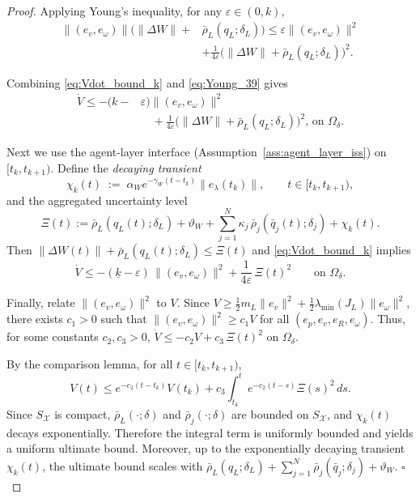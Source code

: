 \documentclass[10pt,a4paper]{amsart}
\begin{document}
\begin{proof}
Applying Young's inequality, for any $\varepsilon\in(0,k)$,
\begin{equation}
\label{eq:Young_39}
\begin{aligned}
\|(e_v,e_\omega)\|\Big(\|\Delta W\|+&\bar\rho_L(q_L;\delta_L)\Big)
\le \varepsilon\|(e_v,e_\omega)\|^2\\
&+\frac{1}{4\varepsilon}
\Big(\|\Delta W\|+\bar\rho_L(q_L;\delta_L)\Big)^2.
\end{aligned}
\end{equation}

Combining \eqref{eq:Vdot_bound_k} and \eqref{eq:Young_39} gives
\begin{equation}
\label{eq:Vdot_bound_40}
\begin{aligned}
\dot V
\le -(k-&\varepsilon)\|(e_v,e_\omega)\|^2\\
&\quad+\frac{1}{4\varepsilon}
\Big(\|\Delta W\|+\bar\rho_L(q_L;\delta_L)\Big)^2,
\, \text{on }\Omega_\delta .
\end{aligned}
\end{equation}


Next we use the agent-layer interface (Assumption~\ref{ass:agent_layer_iss}) on $[t_k,t_{k+1})$. Define the \emph{decaying transient}
\[
\chi_k(t)\;:=\;\alpha_W e^{-\gamma_W(t-t_k)}\|e_\lambda(t_k)\|,\qquad t\in[t_k,t_{k+1}),
\]
and the aggregated uncertainty level
\[
\Xi(t) := \bar\rho_L(q_L(t);\delta_L) + \vartheta_W +
\sum_{j=1}^N \kappa_j\,\bar\rho_j(\bar q_j(t);\delta_j) + \chi_k(t).\]
Then $\|\Delta W(t)\|+\bar\rho_L(q_L(t);\delta_L)\le \Xi(t)$ and \eqref{eq:Vdot_bound_k} implies
\begin{equation}
\dot V
\le
-(\underline{k}-\varepsilon)\,\|(e_v,e_\omega)\|^2
+\frac{1}{4\varepsilon}\,\Xi(t)^2
\qquad\text{on } \Omega_\delta.
\label{eq:Vdot_step3}
\end{equation}

Finally, relate $\|(e_v,e_\omega)\|^2$ to $V$. Since $V\ge \tfrac12 m_L\|e_v\|^2+\tfrac12\lambda_{\min}(J_L)\|e_\omega\|^2$,
there exists $c_1>0$ such that $\|(e_v,e_\omega)\|^2\ge c_1 V$ for all $(e_p,e_v,e_R,e_\omega)$.
Thus, for some constants $c_2,c_3>0$, $\dot V \le -c_2 V + c_3\,\Xi(t)^2$ on $\Omega_\delta$.

By the comparison lemma, for all $t\in[t_k,t_{k+1})$,
\[
V(t)\le e^{-c_2(t-t_k)}V(t_k)+c_3\int_{t_k}^{t} e^{-c_2(t-s)}\Xi(s)^2\,ds.
\]
Since $S_{\mathcal X}$ is compact, $\bar\rho_L(\cdot;\delta)$ and $\bar\rho_j(\cdot;\delta)$ are bounded on $S_{\mathcal X}$,
and $\chi_k(t)$ decays exponentially. Therefore the integral term is uniformly bounded and yields a uniform ultimate bound.
Moreover, up to the exponentially decaying transient $\chi_k(t)$, the ultimate bound scales with
$\bar\rho_L(q_L;\delta_L)+\sum_{j=1}^N\bar\rho_j(\bar q_j;\delta_j)+\vartheta_W$. \hfill$\square$
\end{proof}
\end{document}
